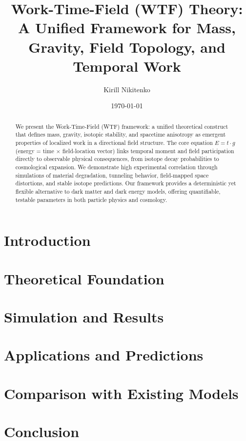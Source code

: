 \documentclass[12pt]{article}
\title{Work-Time-Field (WTF) Theory:\\ A Unified Framework for Mass, Gravity, Field Topology, and Temporal Work}
\author[1]{Kirill Nikitenko}
\affil[1]{Independent Researcher, WTF Framework Initiative}
\date{\today}
\begin{document}
\maketitle

\begin{abstract}
We present the Work-Time-Field (WTF) framework: a unified theoretical construct that defines mass, gravity, isotopic stability, and spacetime anisotropy as emergent properties of localized work in a directional field structure. The core equation \( E = t \cdot g \) (energy = time × field-location vector) links temporal moment and field participation directly to observable physical consequences, from isotope decay probabilities to cosmological expansion. We demonstrate high experimental correlation through simulations of material degradation, tunneling behavior, field-mapped space distortions, and stable isotope predictions. Our framework provides a deterministic yet flexible alternative to dark matter and dark energy models, offering quantifiable, testable parameters in both particle physics and cosmology.
\end{abstract}

\tableofcontents
\newpage

\section{Introduction}


\section{Theoretical Foundation}


\section{Simulation and Results}


\section{Applications and Predictions}


\section{Comparison with Existing Models}


\section{Conclusion}

\end{document}
